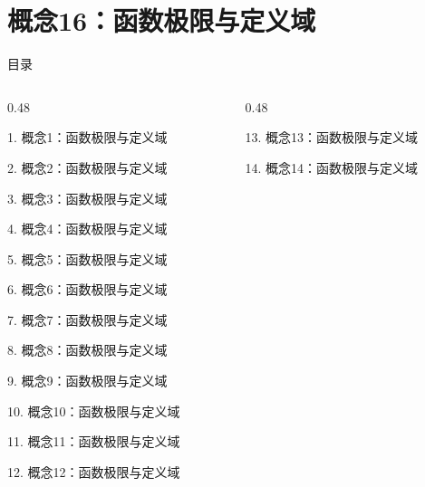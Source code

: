 \documentclass[aspectratio=169,10pt,fontset=fandol]{ctexbeamer}
\begin{document}
\section{概念16：函数极限与定义域}
\begin{frame}[t,fragile]{目录}
\small
\begin{columns}[T,onlytextwidth]
\begin{column}{0.48\textwidth}
{\color{black}\small 1. 概念1：函数极限与定义域\par}\vspace{0.22em}
{\color{black}\small 2. 概念2：函数极限与定义域\par}\vspace{0.22em}
{\color{black}\small 3. 概念3：函数极限与定义域\par}\vspace{0.22em}
{\color{black}\small 4. 概念4：函数极限与定义域\par}\vspace{0.22em}
{\color{black}\small 5. 概念5：函数极限与定义域\par}\vspace{0.22em}
{\color{black}\small 6. 概念6：函数极限与定义域\par}\vspace{0.22em}
{\color{black}\small 7. 概念7：函数极限与定义域\par}\vspace{0.22em}
{\color{black}\small 8. 概念8：函数极限与定义域\par}\vspace{0.22em}
{\color{black}\small 9. 概念9：函数极限与定义域\par}\vspace{0.22em}
{\color{black}\small 10. 概念10：函数极限与定义域\par}\vspace{0.22em}
{\color{black}\small 11. 概念11：函数极限与定义域\par}\vspace{0.22em}
{\color{black}\small 12. 概念12：函数极限与定义域\par}\vspace{0.22em}
\end{column}
\begin{column}{0.48\textwidth}
{\color{black}\small 13. 概念13：函数极限与定义域\par}\vspace{0.22em}
{\color{black}\small 14. 概念14：函数极限与定义域\par}\vspace{0.22em}

\end{column}
\end{columns}
\end{frame}
\end{document}
